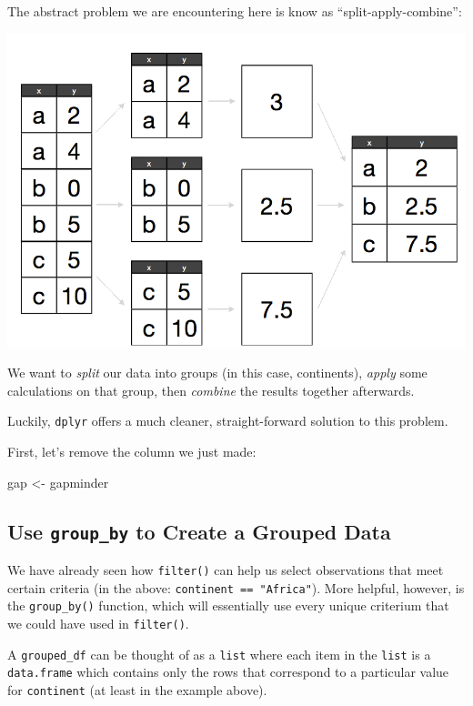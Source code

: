 \documentclass[]{book}
\newenvironment{Shaded}{\begin{snugshade}}{\end{snugshade}}
\newcommand{\StringTok}[1]{\textcolor[rgb]{0.31,0.60,0.02}{#1}}
\newcommand{\NormalTok}[1]{#1}
\begin{document}
The abstract problem we are encountering here is know as
``split-apply-combine'':

\begin{center}\includegraphics[width=0.7\linewidth]{img/splitapply} \end{center}

We want to \emph{split} our data into groups (in this case, continents),
\emph{apply} some calculations on that group, then \emph{combine} the
results together afterwards.

Luckily, \texttt{dplyr} offers a much cleaner, straight-forward solution
to this problem.

First, let's remove the column we just made:

\begin{Shaded}
\begin{Highlighting}[]
\NormalTok{gap <-}\StringTok{ }\NormalTok{gapminder}
\end{Highlighting}
\end{Shaded}

\subsection{\texorpdfstring{Use \texttt{group\_by} to Create a Grouped
Data}{Use group\_by to Create a Grouped Data}}\label{use-group_by-to-create-a-grouped-data}

We have already seen how \texttt{filter()} can help us select
observations that meet certain criteria (in the above:
\texttt{continent\ ==\ "Africa"}). More helpful, however, is the
\texttt{group\_by()} function, which will essentially use every unique
criterium that we could have used in \texttt{filter()}.

A \texttt{grouped\_df} can be thought of as a \texttt{list} where each
item in the \texttt{list} is a \texttt{data.frame} which contains only
the rows that correspond to a particular value for \texttt{continent}
(at least in the example above).
\end{document}

